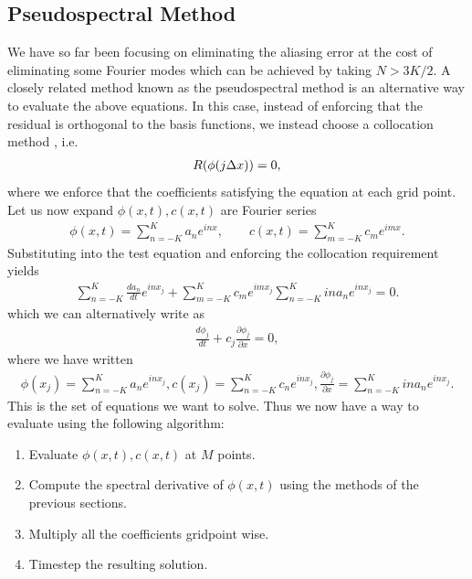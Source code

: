 \subsection{Pseudospectral Method}
We have so far been focusing on eliminating the aliasing error at the cost of eliminating some Fourier modes which can be achieved by taking $N>3K/2$. A closely related method known as the pseudospectral method is an alternative way to evaluate the above equations. In this case, instead of enforcing that the residual is orthogonal to the basis functions, we instead choose a collocation method \cite{durran}, i.e.
\begin{align}
R(\phi(j\Delta x)) = 0,
\end{align}
where we enforce that the coefficients satisfying the equation at each grid point. Let us now expand $\phi(x,t),c(x,t)$ are Fourier series
\begin{align}
\phi(x,t) = \sum_{n=-K}^{K}a_{n}e^{inx}, \qquad c(x,t) = \sum_{m=-K}^{K}c_{m}e^{imx}.
\end{align}
Substituting into the test equation and enforcing the collocation requirement yields
\begin{align}
\sum_{n=-K}^{K}\frac{da_{n}}{dt}e^{inx_{j}} + \sum_{m=-K}^{K}c_{m}e^{imx_{j}}\sum_{n=-K}^{K}ina_{n}e^{inx_{j}}=0.
\end{align} 
which we can alternatively write as
\begin{align}
\frac{d\phi_{j}}{dt} + c_{j}\frac{\partial \phi_{j}}{\partial x} = 0,
\end{align}
where we have written
\begin{align}
\phi(x_{j}) = \sum_{n=-K}^{K}a_{n}e^{inx_{j}}, c(x_{j}) = \sum_{n=-K}^{K}c_{n}e^{inx_{j}}, \frac{\partial\phi_{j}}{\partial x} = \sum_{n=-K}^{K}ina_{n}e^{inx_{j}}.
\end{align}
This is the set of equations we want to solve. Thus we now have a way to evaluate using the following algorithm:
\begin{enumerate}
\item Evaluate $\phi(x,t),c(x,t)$ at $M$ points.
\item Compute the spectral derivative of $\phi(x,t)$ using the methods of the previous sections.
\item Multiply all the coefficients gridpoint wise.
\item Timestep the resulting solution.
\end{enumerate} 

